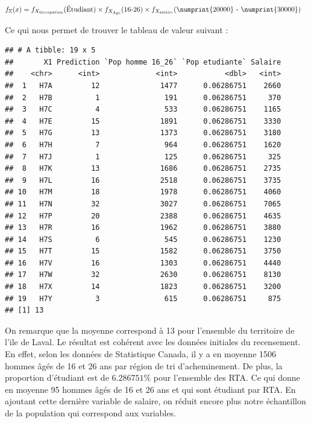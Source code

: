 \documentclass[11pt,french]{article}\usepackage[]{graphicx}\usepackage[]{color}
\makeatletter
\newenvironment{kframe}{%
 \def\at@end@of@kframe{}%
 \ifinner\ifhmode%
  \def\at@end@of@kframe{\end{minipage}}%
  \begin{minipage}{\columnwidth}%
 \fi\fi%
 \def\FrameCommand##1{\hskip\@totalleftmargin \hskip-\fboxsep
 \colorbox{shadecolor}{##1}\hskip-\fboxsep
     \hskip-\linewidth \hskip-\@totalleftmargin \hskip\columnwidth}%
 \MakeFramed {\advance\hsize-\width
   \@totalleftmargin\z@ \linewidth\hsize
   \@setminipage}}%
 {\par\unskip\endMakeFramed%
 \at@end@of@kframe}
\newenvironment{knitrout}{}{} %
\makeatother
\begin{document}
\begin{align*}
f_{\mathbb{X}}(x) &= f_{X_{\text{Occupation}}}(\text{Étudiant}) \times f_{X_{\text{Âge}}}(\text{16-26}) \times f_{X_{\text{salaire}}}(\text{\numprint{20000} - \numprint{30000}})
\end{align*}

Ce qui nous permet de trouver le tableau de valeur suivant :
\begin{knitrout}
\color{fgcolor}\begin{kframe}
\begin{verbatim}
## # A tibble: 19 x 5
##       X1 Prediction `Pop homme 16_26` `Pop etudiante` Salaire
##    <chr>      <int>             <int>           <dbl>   <int>
##  1   H7A         12              1477      0.06286751    2660
##  2   H7B          1               191      0.06286751     370
##  3   H7C          4               533      0.06286751    1165
##  4   H7E         15              1891      0.06286751    3330
##  5   H7G         13              1373      0.06286751    3180
##  6   H7H          7               964      0.06286751    1620
##  7   H7J          1               125      0.06286751     325
##  8   H7K         13              1686      0.06286751    2735
##  9   H7L         16              2518      0.06286751    3735
## 10   H7M         18              1978      0.06286751    4060
## 11   H7N         32              3027      0.06286751    7065
## 12   H7P         20              2388      0.06286751    4635
## 13   H7R         16              1962      0.06286751    3880
## 14   H7S          6               545      0.06286751    1230
## 15   H7T         15              1582      0.06286751    3750
## 16   H7V         16              1303      0.06286751    4440
## 17   H7W         32              2630      0.06286751    8130
## 18   H7X         14              1823      0.06286751    3200
## 19   H7Y          3               615      0.06286751     875
## [1] 13
\end{verbatim}
\end{kframe}
\end{knitrout}
On remarque que la moyenne correspond à 13 pour l'ensemble du territoire de l'ile de Laval. Le résultat est cohérent avec les données initiales du recensement. En effet,
selon les données de Statistique Canada, il y a en moyenne 1506 hommes âgés de 16 et 26 ans par région de tri d'acheminement. De plus, la proportion d'étudiant est de $6.286751 \%$ pour l'ensemble des RTA. Ce qui donne en moyenne 95 hommes âgés de 16 et 26 ans et qui sont étudiant par RTA. En ajoutant cette dernière variable de salaire, on réduit encore plus notre échantillon de la population qui correspond aux variables. \newline
\end{document}
